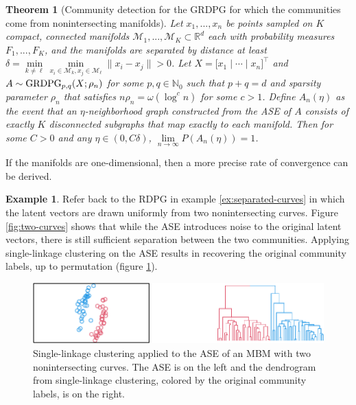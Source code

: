 \documentclass[
  12pt,
]{article}
\newtheorem{theorem}{Theorem}[section]
\theoremstyle{definition}
\theoremstyle{definition}
\newtheorem{example}{Example}[section]
\theoremstyle{definition}
\theoremstyle{definition}
\theoremstyle{remark}
\begin{document}
\begin{theorem}[Community detection for the GRDPG for which the communities come from nonintersecting manifolds]
\label{theorem:nonintersect-grdpg}
Let $x_1, ..., x_n$ be points sampled on $K$ compact, connected manifolds $\mathcal{M}_1, ..., \mathcal{M}_K \subset \mathbb{R}^d$ each with probability measures $F_1, ..., F_K$, and the manifolds are separated by distance at least $\delta = \min\limits_{k \neq \ell} \min\limits_{x_i \in \mathcal{M}_k, x_j \in \mathcal{M}_\ell} \| x_i - x_j \| > 0$. 
Let $X = \Big[ x_1 \mid \cdots \mid x_n \Big]^\top$ and $A \sim \mathrm{GRDPG}_{p,q}(X; \rho_n)$ for some $p, q \in \mathbb{N}_0$ such that $p + q = d$ and sparsity parameter $\rho_n$ that satisfies $n \rho_n = \omega(\log^c n)$ for some $c > 1$. 
Define $A_n(\eta)$ as the event that an $\eta$-neighborhood graph constructed from the ASE of $A$ consists of exactly $K$ disconnected subgraphs that map exactly to each manifold. 
Then for some $C > 0$ and any $\eta \in (0, C \delta)$, $\lim\limits_{n \to \infty} P(A_n(\eta)) = 1$. 
\end{theorem}

If the manifolds are one-dimensional, then a more precise rate of convergence can be derived.

\begin{example}
\label{ex:separated-curves-2}
Refer back to the RDPG in example \ref{ex:separated-curves} in which the latent vectors are drawn uniformly from two nonintersecting curves. 
Figure \ref{fig:two-curves} shows that while the ASE introduces noise to the original latent vectors, there is still sufficient separation between the two communities. 
Applying single-linkage clustering on the ASE results in recovering the original community labels, up to permutation (figure \ref{fig:two-curves-2}). 

\begin{figure}[H]

{\centering \includegraphics{draft_files/figure-latex/two-curves-2-1} 

}

\caption{Single-linkage clustering applied to the ASE of an MBM with two nonintersecting curves. The ASE is on the left and the dendrogram from single-linkage clustering, colored by the original community labels, is on the right.}\label{fig:two-curves-2}
\end{figure}
\end{example}
\end{document}
